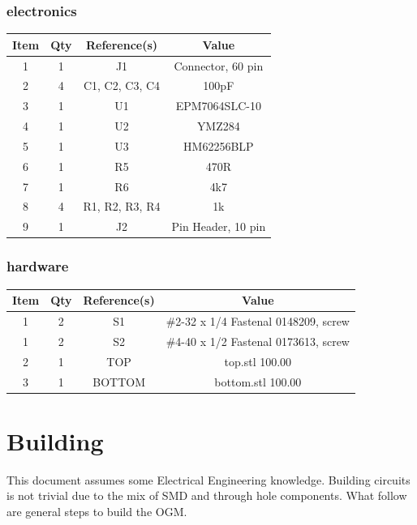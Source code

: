 \subsubsection{electronics}
\begin{footnotesize}
\begin{longtable}{ |*{4}{c|} }
\hline
{Item} & {Qty} & {Reference(s)} & {Value} \\
\hline
{1} & {1} & {J1} & {Connector, 60 pin} \\
\hline
{2} & {4} & {C1, C2, C3, C4} & {100pF} \\
\hline
{3} & {1} & {U1} & {EPM7064SLC-10} \\
\hline
{4} & {1} & {U2} & {YMZ284} \\
\hline
{5} & {1} & {U3} & {HM62256BLP} \\
\hline
{6} & {1} & {R5} & {470R} \\
\hline
{7} & {1} & {R6} & {4k7} \\
\hline
{8} & {4} & {R1, R2, R3, R4} & {1k} \\
\hline
{9} & {1} & {J2} & {Pin Header, 10 pin} \\
\hline
\end{longtable}
\end{footnotesize}

\subsubsection{hardware}
\begin{footnotesize}
\begin{longtable}{ |*{4}{c|} }
\hline
{Item} & {Qty} & {Reference(s)} & {Value} \\
\hline
{1} & {2} & {S1} & {\#2-32 x 1/4 Fastenal 0148209, screw} \\
\hline
{1} & {2} & {S2} & {\#4-40 x 1/2 Fastenal 0173613, screw} \\
\hline
{2} & {1} & {TOP} & {top.stl 100.00} \\
\hline
{3} & {1} & {BOTTOM} & {bottom.stl 100.00} \\
\hline
\end{longtable}
\end{footnotesize}

\section{Building}

\par
This document assumes some Electrical Engineering knowledge. Building circuits is not
trivial due to the mix of SMD and through hole components. What follow are general
steps to build the OGM.

